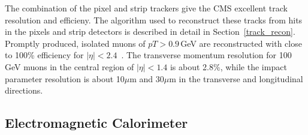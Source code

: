 The combination of the pixel and strip trackers give the CMS excellent track resolution and efficieny. The algorithm used to reconstruct these tracks from hits in the pixels and strip detectors is described in detail in Section~\ref{track_recon}.  Promptly  produced,  isolated  muons  of $pT>0.9$\,GeV are reconstructed with close to 100\% efficiency for $|\eta|<2.4$~\cite{track_reconstruction}. The transverse momentum resolution for 100\,GeV muons in the central region of $|\eta|<1.4$ is about 2.8\%, while the impact parameter resolution is about 10$\mu$m and 30$\mu$m in the transverse and longitudinal directions.


\subsection{Electromagnetic Calorimeter}
\label{Ecal}
